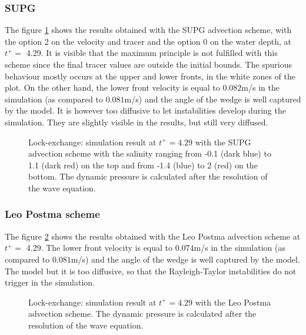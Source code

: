 \subsubsection{SUPG}
The figure \ref{fig:lock-exchange_dp_no_SUPG} shows the results obtained with the SUPG advection scheme, with the option 2 on the velocity and tracer and the option 0 on the water depth, at $t^+=$ 4.29.
It is visible that the maximum principle is not fulfilled with this scheme since the final tracer values are outside the initial bounds.
The spurious behaviour mostly occurs at the upper and lower fronts, in the white zones of the plot.
On the other hand, the lower front velocity is equal to $0.082$m/s in the simulation (as compared to $0.081$m/s) and the angle of the wedge
is well captured by the model. It is however too diffusive to let instabilities develop during the simulation.
They are slightly visible in the results, but still very diffused.
\begin{figure}[ht]
  \begin{center}
    \caption{Lock-exchange: simulation result at $t^+=4.29$ with the SUPG advection scheme with the salinity ranging from -0.1 (dark blue)
      to 1.1 (dark red) on the top and from -1.4 (blue) to 2 (red) on the bottom.
      The dynamic pressure is calculated after the resolution of the wave equation.}
    \label{fig:lock-exchange_dp_no_SUPG}
  \end{center}
\end{figure}

\subsubsection{Leo Postma scheme}
The figure \ref{fig:lock-exchange_dp_no_LP} shows the results obtained with the Leo Postma advection scheme at $t^+=$ 4.29.
The lower front velocity is equal to $0.074$m/s in the simulation (as compared to $0.081$m/s) and the angle of the wedge
is well captured by the model. The model but it is too diffusive, so that the Rayleigh-Taylor instabilities do not trigger in the simulation.
\begin{figure}[ht]
  \begin{center}
    \caption{Lock-exchange: simulation result at $t^+=4.29$ with the Leo Postma advection scheme.
      The dynamic pressure is calculated after the resolution of the wave equation.}
    \label{fig:lock-exchange_dp_no_LP}
  \end{center}
\end{figure}

